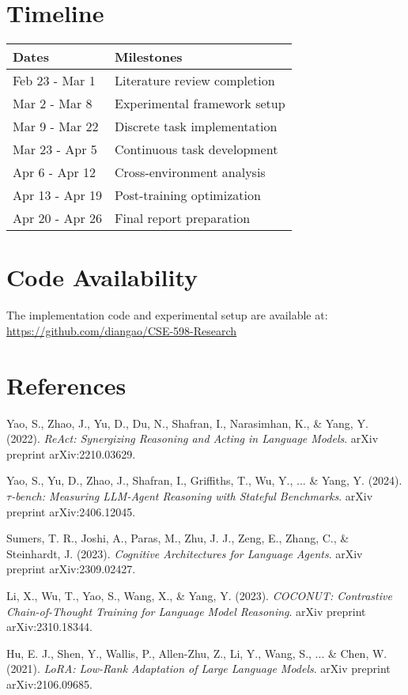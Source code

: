 \documentclass[11pt]{article}
\begin{document}
\section{Timeline}
\begin{tabular}{@{}ll@{}}
\toprule
\textbf{Dates} & \textbf{Milestones} \\ 
\midrule
Feb 23 - Mar 1 & Literature review completion \\
Mar 2 - Mar 8 & Experimental framework setup \\
Mar 9 - Mar 22 & Discrete task implementation \\
Mar 23 - Apr 5 & Continuous task development \\
Apr 6 - Apr 12 & Cross-environment analysis \\
Apr 13 - Apr 19 & Post-training optimization \\
Apr 20 - Apr 26 & Final report preparation \\
\bottomrule
\end{tabular}

\section{Code Availability}
The implementation code and experimental setup are available at: \url{https://github.com/diangao/CSE-598-Research}

\section{References}

\begin{thebibliography}{9}

Yao, S., Zhao, J., Yu, D., Du, N., Shafran, I., Narasimhan, K., \& Yang, Y. (2022).
\textit{ReAct: Synergizing Reasoning and Acting in Language Models}.
arXiv preprint arXiv:2210.03629.

Yao, S., Yu, D., Zhao, J., Shafran, I., Griffiths, T., Wu, Y., ... \& Yang, Y. (2024).
\textit{$\tau$-bench: Measuring LLM-Agent Reasoning with Stateful Benchmarks}.
arXiv preprint arXiv:2406.12045.

Sumers, T. R., Joshi, A., Paras, M., Zhu, J. J., Zeng, E., Zhang, C., \& Steinhardt, J. (2023).
\textit{Cognitive Architectures for Language Agents}.
arXiv preprint arXiv:2309.02427.

Li, X., Wu, T., Yao, S., Wang, X., \& Yang, Y. (2023).
\textit{COCONUT: Contrastive Chain-of-Thought Training for Language Model Reasoning}.
arXiv preprint arXiv:2310.18344.

Hu, E. J., Shen, Y., Wallis, P., Allen-Zhu, Z., Li, Y., Wang, S., ... \& Chen, W. (2021).
\textit{LoRA: Low-Rank Adaptation of Large Language Models}.
arXiv preprint arXiv:2106.09685.

\end{thebibliography}

\hypersetup{
    linkcolor=blue,
    citecolor=red,
    urlcolor=magenta
}
\end{document}
